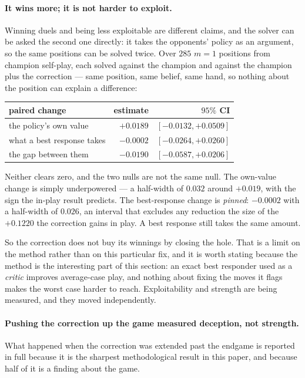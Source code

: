 \documentclass[11pt,letterpaper]{article}
\begin{document}
\paragraph{It wins more; it is not harder to exploit.} Winning duels and being
less exploitable are different claims, and the solver can be asked the second
one directly: it takes the opponents' policy as an argument, so the same
positions can be solved twice. Over $285$ $m = 1$ positions from champion
self-play, each solved against the champion and against the champion plus the
correction --- same position, same belief, same hand, so nothing about the
position can explain a difference:

\begin{center}
\begin{tabular}{lrr}
\toprule
paired change & estimate & $95\%$ CI \\
\midrule
the policy's own value & $+0.0189$ & $[-0.0132, +0.0509]$ \\
what a best response takes & $-0.0002$ & $[-0.0264, +0.0260]$ \\
the gap between them & $-0.0190$ & $[-0.0587, +0.0206]$ \\
\bottomrule
\end{tabular}
\end{center}

Neither clears zero, and the two nulls are not the same null. The own-value
change is simply underpowered --- a half-width of $0.032$ around $+0.019$, with
the sign the in-play result predicts. The best-response change is
\emph{pinned}: $-0.0002$ with a half-width of $0.026$, an interval that
excludes any reduction the size of the $+0.1220$ the correction gains in play.
A best response still takes the same amount.

So the correction does not buy its winnings by closing the hole. That is a
limit on the method rather than on this particular fix, and it is worth stating
because the method is the interesting part of this section: an exact best
responder used as a \emph{critic} improves average-case play, and nothing about
fixing the moves it flags makes the worst case harder to reach. Exploitability
and strength are being measured, and they moved independently.

\paragraph{Pushing the correction up the game measured deception, not strength.}
What happened when the correction was extended past the endgame is reported in
full because it is the sharpest methodological result in this paper, and
because half of it is a finding about the game.
\end{document}
